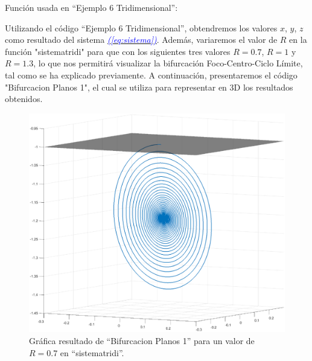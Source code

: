 \documentclass[12pt,a4paper]{report} %
\newcommand{\eref}[1]{\hyperref[#1]{\textcolor{blue}{\textit{(\ref*{#1})}}}}
\begin{document}
	\vspace{0.5cm}
	
	\vspace{0.5cm}\noindent Función usada en ``Ejemplo 6 Tridimensional'':
	\vspace{0.5cm}
	
	\newpage
	
	\noindent Utilizando el código ``Ejemplo 6 Tridimensional'', obtendremos los valores $x$, $y$, $z$ como resultado del sistema \eref{eq:sistema}. Además, variaremos el valor de $R$ en la función "sistematridi" para que con los siguientes tres valores $R=0.7$, $R=1$ y $R=1.3$, lo que nos permitirá visualizar la bifurcación Foco-Centro-Ciclo Límite, tal como se ha explicado previamente. A continuación, presentaremos el código "Bifurcacion Planos 1", el cual se utiliza para representar en 3D los resultados obtenidos.
	
	\vspace{0.5cm}
	
	\newpage
	
	\begin{figure}[h]
		\centering
		\includegraphics[width=1\textwidth]{fococir.eps}
		\caption{Gráfica resultado de ``Bifurcacion Planos 1'' para un valor de $R=0.7$ en ``sistematridi''.}
		\label{fig:fococircuito}
	\end{figure}\smallskip
	
\end{document}
